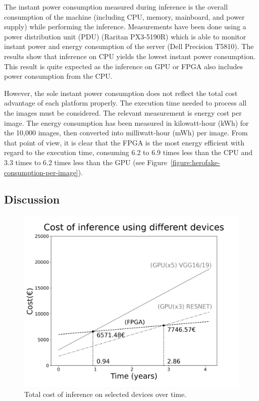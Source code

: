 The instant power consumption measured during inference is  the overall consumption of the machine (including CPU, memory, mainboard, and power supply) while performing the inference. 
Measurements have been done using a power distribution unit (PDU) (Raritan PX3-5190R) which is able to monitor instant power and energy consumption of the server (Dell Precision T5810). The results show that inference on CPU yields the lowest instant power consumption. This result is quite expected as the inference on GPU or FPGA also includes power consumption from the CPU. %


However, the sole instant power consumption does not reflect the total cost advantage of each platform properly. The execution time needed to process all the images must be considered. The relevant measurement is energy cost per image. The energy consumption has been measured in kilowatt-hour (kWh) for the 10,000 images, then converted into milliwatt-hour (mWh) per image. From that point of view, it is clear that the FPGA is the most energy efficient with regard to the execution time, consuming 6.2 to 6.9 times less than the CPU and 3.3 times to 6.2 times less than the GPU (see Figure~\ref{figure:herofake-consumption-per-image}).

\subsection{Discussion}

\begin{figure}[t]
\centering
\includegraphics[scale=0.2]{5_Chapitre3/figures/characterization/cost_devices_time.png}
\caption{Total cost of inference on selected devices over time.}
\label{figure:herofake-cost-over-time}
\end{figure}

